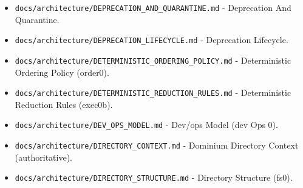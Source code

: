 \documentclass[9pt,a4paper,openany]{book}
\begin{document}
\begin{itemize}
\item \texttt{docs/\allowbreak{}architecture/\allowbreak{}DEPRECATION\_\allowbreak{}AND\_\allowbreak{}QUARANTINE.\allowbreak{}md} -\allowbreak{} Deprecation And Quarantine.\allowbreak{}
\end{itemize}

\begin{itemize}
\item \texttt{docs/\allowbreak{}architecture/\allowbreak{}DEPRECATION\_\allowbreak{}LIFECYCLE.\allowbreak{}md} -\allowbreak{} Deprecation Lifecycle.\allowbreak{}
\end{itemize}

\begin{itemize}
\item \texttt{docs/\allowbreak{}architecture/\allowbreak{}DETERMINISTIC\_\allowbreak{}ORDERING\_\allowbreak{}POLICY.\allowbreak{}md} -\allowbreak{} Deterministic Ordering Policy (order0).\allowbreak{}
\end{itemize}

\begin{itemize}
\item \texttt{docs/\allowbreak{}architecture/\allowbreak{}DETERMINISTIC\_\allowbreak{}REDUCTION\_\allowbreak{}RULES.\allowbreak{}md} -\allowbreak{} Deterministic Reduction Rules (exec0b).\allowbreak{}
\end{itemize}

\begin{itemize}
\item \texttt{docs/\allowbreak{}architecture/\allowbreak{}DEV\_\allowbreak{}OPS\_\allowbreak{}MODEL.\allowbreak{}md} -\allowbreak{} Dev/\allowbreak{}ops Model (dev Ops 0).\allowbreak{}
\end{itemize}

\begin{itemize}
\item \texttt{docs/\allowbreak{}architecture/\allowbreak{}DIRECTORY\_\allowbreak{}CONTEXT.\allowbreak{}md} -\allowbreak{} Dominium Directory Context (authoritative).\allowbreak{}
\end{itemize}

\begin{itemize}
\item \texttt{docs/\allowbreak{}architecture/\allowbreak{}DIRECTORY\_\allowbreak{}STRUCTURE.\allowbreak{}md} -\allowbreak{} Directory Structure (fs0).\allowbreak{}
\end{itemize}
\end{document}

